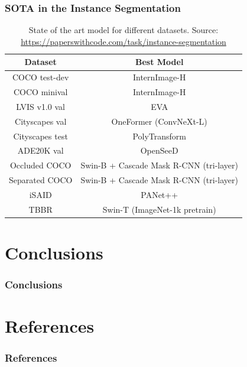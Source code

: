 \documentclass{beamer}
\begin{document}
\begin{frame}
    \frametitle{SOTA in the Instance Segmentation}

    \begin{table}
        \begin{tabular}{|c|c|}
            \hline
            \textbf{Dataset} & \textbf{Best Model}                     \\
            \hline
            \hline
            COCO test-dev    & InternImage-H                           \\
            \hline
            COCO minival     & InternImage-H                           \\
            \hline
            LVIS v1.0 val    & EVA                                     \\
            \hline
            Cityscapes val   & OneFormer (ConvNeXt-L)                  \\
            \hline
            Cityscapes test  & PolyTransform                           \\
            \hline
            ADE20K val       & OpenSeeD                                \\
            \hline
            Occluded COCO    & Swin-B + Cascade Mask R-CNN (tri-layer) \\
            \hline
            Separated COCO   & Swin-B + Cascade Mask R-CNN (tri-layer) \\
            \hline
            iSAID            & PANet++                                 \\
            \hline
            TBBR             & Swin-T (ImageNet-1k pretrain)           \\
            \hline
        \end{tabular}
        \caption{State of the art model for different datasets. Source:
            \url{https://paperswithcode.com/task/instance-segmentation}}
    \end{table}

\end{frame}

\section*{Conclusions}
\begin{frame}
    \frametitle{Conclusions}



\end{frame}

\section*{References}

\begin{frame}[allowframebreaks]
    \frametitle{References}

    
    
\end{frame}
\end{document}
